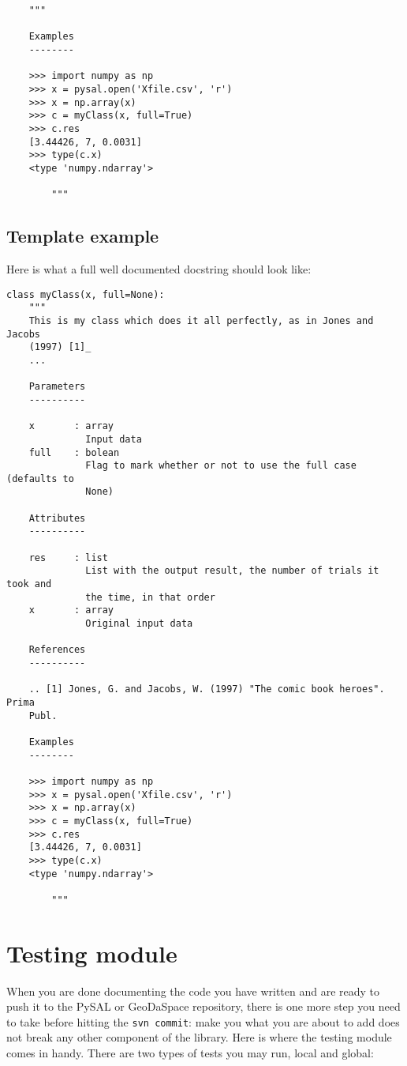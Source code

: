 \documentclass{article}
\begin{document}
\begin{verbatim}
    """

    Examples
    --------

    >>> import numpy as np
    >>> x = pysal.open('Xfile.csv', 'r')
    >>> x = np.array(x)
    >>> c = myClass(x, full=True)
    >>> c.res
    [3.44426, 7, 0.0031]
    >>> type(c.x)
    <type 'numpy.ndarray'>

        """
\end{verbatim}

\newpage

\subsection{Template example}
Here is what a full well documented docstring should look like:

\begin{verbatim}
class myClass(x, full=None):
    """
    This is my class which does it all perfectly, as in Jones and Jacobs
    (1997) [1]_
    ...

    Parameters
    ----------

    x       : array
              Input data
    full    : bolean
              Flag to mark whether or not to use the full case (defaults to
              None)

    Attributes
    ----------

    res     : list
              List with the output result, the number of trials it took and
              the time, in that order
    x       : array
              Original input data

    References
    ----------

    .. [1] Jones, G. and Jacobs, W. (1997) "The comic book heroes". Prima
    Publ.
 
    Examples
    --------

    >>> import numpy as np
    >>> x = pysal.open('Xfile.csv', 'r')
    >>> x = np.array(x)
    >>> c = myClass(x, full=True)
    >>> c.res
    [3.44426, 7, 0.0031]
    >>> type(c.x)
    <type 'numpy.ndarray'>

        """
\end{verbatim}

\newpage

\section{Testing module}
When you are done documenting the code you have written and are ready to push
it to the PySAL or GeoDaSpace repository, there is one more step you need to
take before hitting the \texttt{svn commit}: make you what you are about to
add does not break any other component of the library. Here is where the
testing module comes in handy. There are two types of tests you may run, local
and global:
\end{document}
